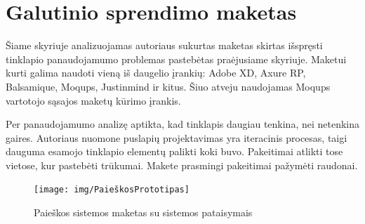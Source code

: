 \documentclass{VUMIFPSkursinis}
\begin{document}




\section{Galutinio sprendimo maketas}
Šiame skyriuje analizuojamas autoriaus sukurtas maketas skirtas išspręsti tinklapio panaudojamumo problemas pastebėtas praėjusiame skyriuje. Maketui kurti galima naudoti vieną iš daugelio įrankių: Adobe XD, Axure RP, Balsamique, Moqups, Justinmind ir kitus. Šiuo atveju naudojamas Moqups vartotojo sąsajos maketų kūrimo įrankis.

Per panaudojamumo analizę aptikta, kad tinklapis daugiau tenkina, nei netenkina gaires. Autoriaus nuomone puslapių projektavimas yra iteracinis procesas, taigi dauguma esamojo tinklapio elementų palikti koki buvo. Pakeitimai atlikti tose vietose, kur pastebėti trūkumai. Makete prasmingi pakeitimai pažymėti raudonai.

\begin{figure}[H]
    \centering
    \texttt{[image: img/PaieškosPrototipas]}
    \caption{Paieškos sistemos maketas su sistemos pataisymais}
    \label{img:PaieškosPrototipas}
\end{figure}
\end{document}
